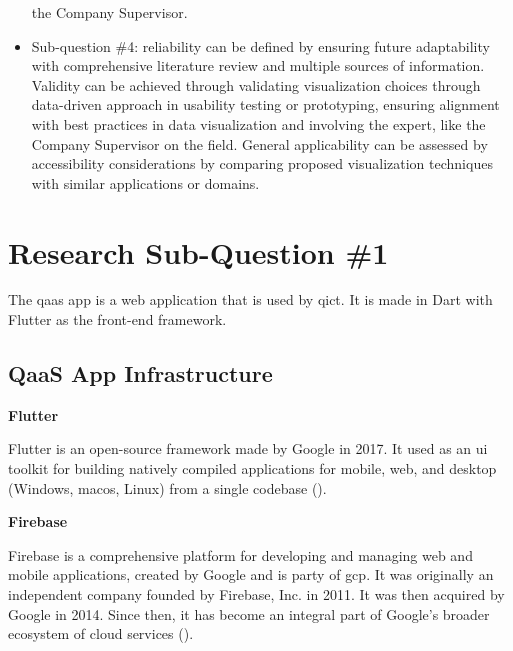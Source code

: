 \begin{multicols}{2}
\begin{itemize}[label=-]
                  the Company Supervisor.
            \item Sub-question \#4: reliability can be defined by ensuring future adaptability with comprehensive
                  literature review and multiple sources of information. Validity can be achieved through validating
                  visualization choices through data-driven approach in usability testing or  prototyping, ensuring
                  alignment with best practices in data visualization and involving the expert, like the Company
                  Supervisor on the field. General applicability can be assessed by accessibility considerations by
                  comparing proposed visualization techniques with similar applications or domains.
      \end{itemize}
      \section{Research Sub-Question \#1}
      The \acrshort{qaas} app is a web application that is used by \acrshort{qict}. It is made in Dart with Flutter as
      the front-end framework.

      \subsection{QaaS App Infrastructure}
      \textbf{Flutter}

      Flutter is an open-source framework made by Google in 2017. It used as an \acrshort{ui} toolkit for building
      natively compiled applications for mobile, web, and desktop (Windows, mac\acrshort{os}, Linux) from a single
      codebase (\cite{flutter}).

      \textbf{Firebase}

      Firebase is a comprehensive platform for developing and managing web and mobile applications, created by
      Google and is party of \acrshort{gcp}. It was originally an independent company founded by Firebase, Inc.
      in 2011. It was then acquired by Google in 2014. Since then, it has become an integral part of Google's
      broader ecosystem of cloud services (\cite{firebase}).


\end{multicols}
